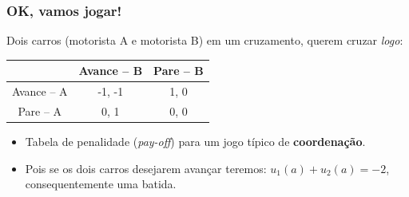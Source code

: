 
\begin{frame}
\frametitle{OK, vamos jogar!}



 Dois carros (motorista A e motorista B) em um cruzamento, querem cruzar \textit{logo}:

    \begin{center}
      \begin{tabular}{c||c|c}
                 & Avance -- B & Pare -- B \\ \hline \hline
      Avance -- A   & -1, -1     &  1, 0      \\ \hline
      Pare -- A     & 0, 1   & 0, 0         \\ \hline \hline
      \end{tabular}
    \end{center}
    
\pause 
\begin{itemize}
  \item Tabela de penalidade (\textit{pay-off}) para um jogo típico de \textbf{coordenação}. 
  
  \item Pois
se os dois carros desejarem avançar teremos: $u_1(a) + u_2(a) = -2$, consequentemente
uma batida.

\end{itemize}

\end{frame}


